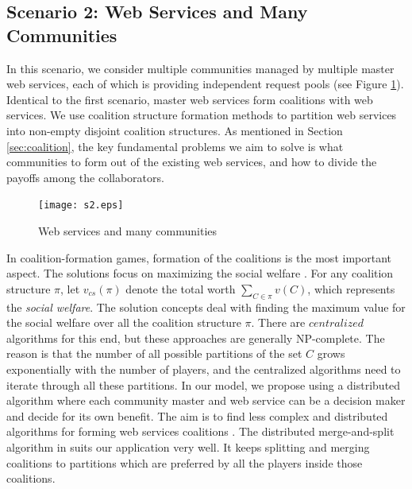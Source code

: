 \documentclass[10pt,journal,cspaper,compsoc]{IEEEtran}
\begin{document}
\subsection {Scenario 2: Web Services and Many Communities}

In this scenario, we consider multiple communities managed by
multiple master web services, each of which is providing
independent request pools (see Figure \ref{fig_sim2}). Identical
to the first scenario, master web services form coalitions with
web services. We use coalition structure formation methods to
partition web services into non-empty disjoint coalition
structures. As mentioned in Section \ref{sec:coalition}, the key
fundamental problems we aim to solve is what communities to form
out of the existing web services, and how to divide the payoffs
among the collaborators.

\begin{figure}[!t]
\centering
\texttt{[image: s2.eps]}
\caption{Web services and many communities} \label{fig_sim2}
\end{figure}

In coalition-formation games, formation of the coalitions is the
most important aspect. The solutions focus on maximizing the
social welfare \cite{
DBLP:conf/ijcai/GrecoMPS11,Sandholm1999209,DBLP:conf/ijcai/RahwanMJ11}.
For any coalition structure $\pi$, let $v_{cs}(\pi)$ denote the
total worth $\sum_{C \in \pi}{v(C)}$, which represents the
\emph{social welfare}. The solution concepts deal with finding the
maximum value for the social welfare over all the coalition
structure $\pi$. There are $centralized$ algorithms for this end,
but these approaches are generally NP-complete. The reason is that
the number of all possible partitions of the set $C$ grows
exponentially with the number of players, and the centralized
algorithms need to iterate through all these partitions.
In our model, we propose using a distributed algorithm where each
community master and web service can be a decision maker and
decide for its own benefit. The aim is to find less complex and
distributed algorithms for forming web services coalitions
\cite{DBLP:journals/igtr/AptW09,Dieckmann02dynamiccoalition,ray2007game}.
The distributed merge-and-split algorithm in
\cite{DBLP:journals/igtr/AptW09} suits our application very well.
It keeps splitting and merging coalitions to partitions which are
preferred by all the players inside those coalitions.
\end{document}
